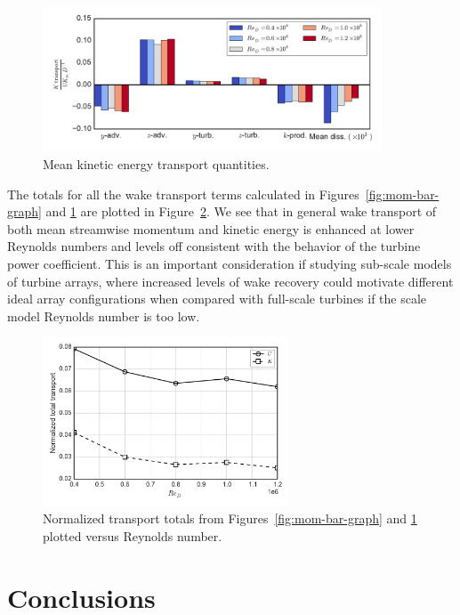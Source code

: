 \documentclass[energies,article,accept,moreauthors,pdftex,12pt,a4paper]{mdpi}
\begin{document}
\begin{figure}[ht!]
\centering
\includegraphics[width=0.9\textwidth]{figures/K_trans_bar_graph}
\caption{Mean kinetic energy transport quantities.}
\label{fig:K-bar-graph}
\end{figure}

The totals for all the wake transport terms calculated in
Figures~\ref{fig:mom-bar-graph} and \ref{fig:K-bar-graph} are plotted in
Figure~\ref{fig:wake-trans-totals}. We see that in general wake transport of
both mean streamwise momentum and kinetic energy is enhanced at lower Reynolds
numbers and levels off consistent with the behavior of the turbine power
coefficient. This is an important consideration if studying sub-scale models of
turbine arrays, where increased levels of wake recovery could motivate different
ideal array configurations when compared with full-scale turbines if the scale
model Reynolds number is too low.

\begin{figure}[ht!]
\centering
\includegraphics[width=0.65\textwidth]{figures/wake_trans_totals}
\caption{Normalized transport totals from Figures~\ref{fig:mom-bar-graph} and
\ref{fig:K-bar-graph} plotted versus Reynolds number.}
\label{fig:wake-trans-totals}
\end{figure}


\section{Conclusions}
\end{document}
